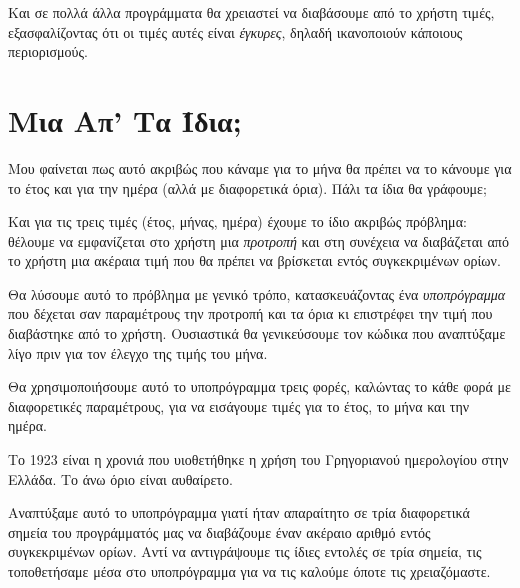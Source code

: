 \documentclass[a4paper,11pt,oneside]{book}
\begin{document}

Και σε πολλά άλλα προγράμματα θα χρειαστεί να διαβάσουμε από το χρήστη τιμές, εξασφαλίζοντας ότι οι τιμές αυτές είναι \emph{έγκυρες}, δηλαδή ικανοποιούν κάποιους περιορισμούς.


\section{Μια Απ' Τα Ίδια;}

\begin{question}
Μου φαίνεται πως αυτό ακριβώς που κάναμε για το μήνα θα πρέπει να το κάνουμε για το έτος και για την ημέρα (αλλά με διαφορετικά όρια). Πάλι τα ίδια θα γράφουμε;
\end{question}

Και για τις τρεις τιμές (έτος, μήνας, ημέρα) έχουμε το ίδιο ακριβώς πρόβλημα: θέλουμε να εμφανίζεται στο χρήστη μια \emph{προτροπή} και στη συνέχεια να διαβάζεται από το χρήστη μια ακέραια τιμή που θα πρέπει να βρίσκεται εντός συγκεκριμένων ορίων. 

Θα λύσουμε αυτό το πρόβλημα με γενικό τρόπο, κατασκευάζοντας ένα \emph{υποπρόγραμμα} που δέχεται σαν παραμέτρους την προτροπή και τα όρια κι επιστρέφει την τιμή που διαβάστηκε από το χρήστη. Ουσιαστικά θα γενικεύσουμε τον κώδικα που αναπτύξαμε λίγο πριν για τον έλεγχο της τιμής του μήνα.


Θα χρησιμοποιήσουμε αυτό το υποπρόγραμμα τρεις φορές, καλώντας το κάθε φορά με διαφορετικές παραμέτρους, για να εισάγουμε τιμές για το έτος, το μήνα και την ημέρα.


Το 1923 είναι η χρονιά που υιοθετήθηκε η χρήση του Γρηγοριανού ημερολογίου στην Ελλάδα. Το άνω όριο είναι αυθαίρετο. 

Αναπτύξαμε αυτό το υποπρόγραμμα γιατί ήταν απαραίτητο σε τρία διαφορετικά σημεία του προγράμματός μας να διαβάζουμε έναν ακέραιο αριθμό εντός συγκεκριμένων ορίων. Αντί να αντιγράψουμε τις ίδιες εντολές σε τρία σημεία, τις τοποθετήσαμε μέσα στο υποπρόγραμμα για να τις καλούμε όποτε τις χρειαζόμαστε. 
\end{document}
